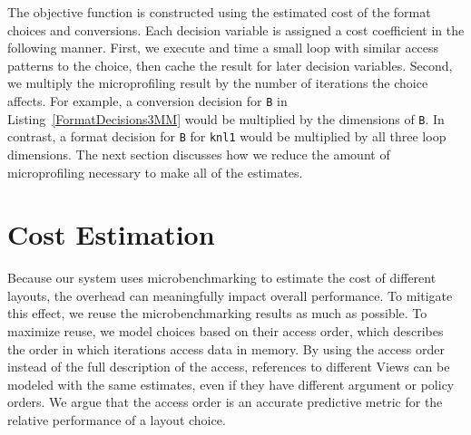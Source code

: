\documentclass[sigconf, table]{acmart}
\begin{document}
The objective function is constructed using the estimated cost of the format choices and conversions. 
Each decision variable is assigned a cost coefficient in the following manner.
First, we execute and time a small loop with similar access patterns to the choice, then cache the result for later decision variables.
Second, we multiply the microprofiling result by the number of iterations the choice affects.
For example, a conversion decision for \verb.B. in Listing~\ref{FormatDecisions3MM} would be multiplied by the dimensions of \verb.B..
In contrast, a format decision for \verb.B. for \verb.knl1. would be multiplied by all three loop dimensions. 
The next section discusses how we reduce the amount of microprofiling necessary to make all of the estimates.

\section{Cost Estimation}

Because our system uses microbenchmarking to estimate the cost of different layouts, the overhead can meaningfully impact overall performance. 
To mitigate this effect, we reuse the microbenchmarking results as much as possible. 
To maximize reuse, we model choices based on their access order, which describes the order in which iterations access data in memory.
By using the access order instead of the full description of the access, references to different Views can be modeled with the same estimates, even if they have different argument or policy orders.
We argue that the access order is an accurate predictive metric for the relative performance of a layout choice. 
\end{document}
